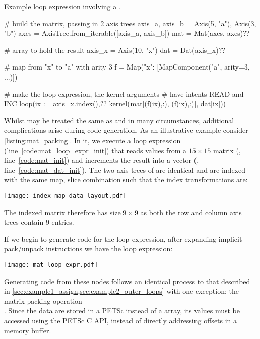 \documentclass[thesis]{subfiles}
\begin{document}
\begin{listing}
  \caption{
    Example loop expression involving a .
  }
  \centering
  \begin{minipage}{.9\textwidth}
    \begin{pyalg2}
      # build the matrix, passing in 2 axis trees
      axis_a, axis_b = Axis(5, "a"), Axis(3, "b")
      axes = AxisTree.from_iterable([axis_a, axis_b])
      mat = Mat(axes, axes)?\label{code:mat_init}?

      # array to hold the result
      axis_x = Axis(10, "x")
      dat = Dat(axis_x)?\label{code:mat_dat_init}?

      # map from "x" to "a" with arity 3
      f = Map({"x": [MapComponent("a", arity=3, ...)]})

      # make the loop expression, the kernel arguments
      # have intents READ and INC
      loop(ix := axis_x.index(),?\label{code:mat_loop_expr_init}?
           kernel(mat[(f(ix),:), (f(ix),:)], dat[ix]))
    \end{pyalg2}
  \end{minipage}
  \label{listing:mat_packing}
\end{listing}

Whilst  may be treated the same as  and  in many circumstances, additional complications arise during code generation.
As an illustrative example consider \cref{listing:mat_packing}.
In it, we execute a loop expression (line~\ref{code:mat_loop_expr_init}) that reads values from a $15 \times 15$ matrix (, line~\ref{code:mat_init}) and increments the result into a vector (, line~\ref{code:mat_dat_init}).
The two axis trees of  are identical and are indexed with the same map, slice combination such that the index transformations are:
\begin{center}
  \texttt{[image: index\_map\_data\_layout.pdf]}
\end{center}
The indexed matrix therefore has size $9 \times 9$ as both the row and column axis trees contain 9 entries.

If we begin to generate code for the loop expression, after expanding implicit pack/unpack instructions we have the loop expression:
\begin{center}
  \texttt{[image: mat\_loop\_expr.pdf]}
\end{center}
Generating code from these nodes follows an identical process to that described in \cref{sec:example1_assign,sec:example2_outer_loops} with one exception: the matrix packing operation\\
.
Since the data are stored in a PETSc  instead of a \numpy{} array, its values must be accessed using the PETSc C API, instead of directly addressing offsets in a memory buffer.
\end{document}
